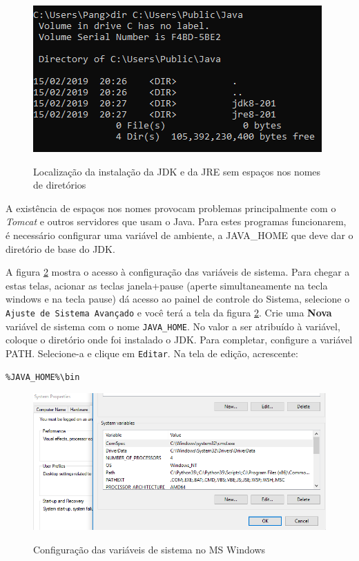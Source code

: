 \documentclass[
	12pt,				%
	openright,			%
	twoside,			%
	a4paper,			%
	english,			%
	french,				%
	spanish,			%
	brazil				%
	]{abntex2}
\begin{document}
\begin{figure}[h]
\begin{center}
\includegraphics[scale=0.5]{jdk-dirs.png} 
\caption{Localização da instalação da JDK e da JRE sem espaços nos nomes de diretórios}
\label{jdk-dirs}
\end{center}
\end{figure}

A existência de espaços nos nomes provocam problemas principalmente com o \emph{Tomcat} e outros servidores que usam o Java. Para estes programas funcionarem, é necessário configurar uma variável de ambiente, a JAVA\_HOME que deve dar o diretório de base do JDK.

A figura \ref{sys-var} mostra o acesso à configuração das variáveis de sistema. Para chegar a estas telas, acionar as teclas janela+pause (aperte simultaneamente na tecla windows e na tecla pause) dá acesso ao painel de controle do Sistema, selecione o \texttt{Ajuste de Sistema Avançado} e você terá a tela da figura \ref{sys-var}. Crie uma \textbf{Nova} variável de sistema com o nome \texttt{JAVA\_HOME}. No valor a ser atribuído à variável, coloque o diretório onde foi instalado o JDK. Para completar, configure a variável PATH. Selecione-a e clique em \texttt{Editar}. Na tela de edição, acrescente:

\begin{verbatim}
%JAVA_HOME%\bin
\end{verbatim}

\begin{figure}[h]
\begin{center}
\includegraphics[scale=0.5]{sys-var.png} 
\caption{Configuração das variáveis de sistema no MS Windows}
\label{sys-var}
\end{center}
\end{figure}
\end{document}
